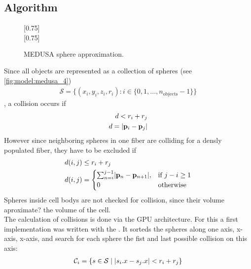 \subsection{Algorithm}
%
\begin{figure}[!t]
    \centering
    \setlength{\tikzwidth}{0.75\textwidth}
    [0.75\textwidth]{
    }
    \\[2em]
    [0.75\textwidth]{
    }
    \caption{\ac{MEDUSA} sphere approximation.}
    \label{fig:medusaCell}
\end{figure}
%
Since all objects are represented as a collection of spheres (see \cref{fig:model:medusa_4})
\begin{align}
    \mathcal{S} = \{ (x_i,y_i,z_i,r_i) : i \in \{0, 1, ..., n_\text{objects}-1\}  \}
\end{align}
%
, a collision occurs if
%
\begin{align}
\begin{split}
d<r_i+r_j\\
d = \lvert\mathbf{p}_i - \mathbf{p}_j\rvert
\end{split}
\end{align}
%
However since neighboring spheres in one fiber are colliding for a densly populated fiber, they have to be excluded if
\begin{align}
\begin{split}
d(i,j) &\leq  r_i + r_j\\
d(i,j) &=
\begin{cases}
\sum_{n=i}^{j-1} \lvert\mathbf{p}_n - \mathbf{p}_{n+1}\rvert,& \text{if } j-i \geq 1\\
0 & \text{otherwise}
\end{cases}
\end{split}
\end{align}
%
Spheres inside cell bodys are not checked for collision, since their volume aproximate? the volume of the cell.
\\
%
The calculation of collisions is done via the GPU architecture. For this a first implementation was written with the  \cite{Karras2012}. It sorteds the spheres along one axis, \eg{} x-axis, x-axis, and search for each sphere the fist and last possible collision on this axis:
\begin{align}
\begin{split}
\mathcal{C}_i = \{ s \in \mathcal{S} \mid \lvert s_i.x - s_j.x\rvert < r_i+r_j \}
\end{split}
\end{align}
